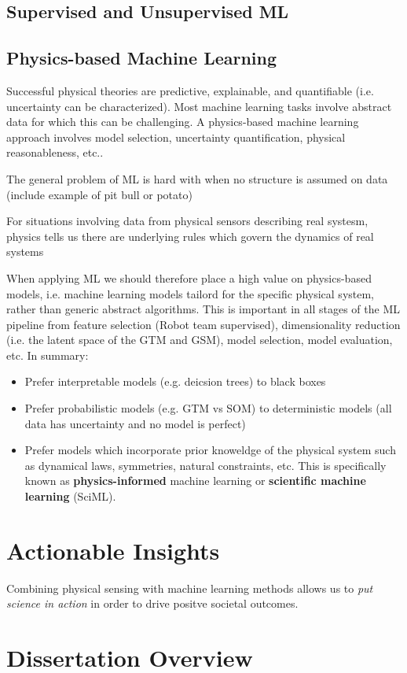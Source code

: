 \subsection{Supervised and Unsupervised ML}


\subsection{Physics-based Machine Learning}

Successful physical theories are predictive, explainable, and quantifiable (i.e.
uncertainty can be characterized). Most machine learning tasks involve abstract
data for which this can be challenging. A physics-based machine learning
approach involves model selection, uncertainty quantification, physical
reasonableness, etc..


The general problem of ML is hard with when no structure is assumed on data (include example of pit bull or potato)

For situations involving data from physical sensors describing real systesm, physics tells us there are underlying rules which govern the dynamics of real systems

When applying ML we should therefore place a high value on physics-based models, i.e. machine learning models tailord for the specific physical system, rather than generic abstract algorithms. This is important in all stages of the ML pipeline from feature selection (Robot team supervised), dimensionality reduction (i.e. the latent space of the GTM and GSM), model selection, model evaluation, etc. In summary:

\begin{itemize}
  \item Prefer interpretable models (e.g. deicsion trees) to black boxes
  \item Prefer probabilistic models (e.g. GTM vs SOM) to deterministic models (all data has uncertainty and no model is perfect)
  \item Prefer models which incorporate prior knoweldge of the physical system such as dynamical laws, symmetries, natural constraints, etc. This is specifically known as \textbf{physics-informed} machine learning or \textbf{scientific machine learning}  (SciML).
\end{itemize}



\section{Actionable Insights}

Combining physical sensing with machine learning methods allows us to \textit{put science in action} in order to drive positve societal outcomes.


\section{Dissertation Overview}

